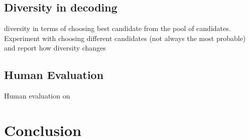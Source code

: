 \documentclass[11pt,a4paper]{article}
\newcommand{\R}{\mathbb{R}}
\begin{document}

\subsection{Diversity in decoding}
diversity in terms of choosing best candidate from the pool of candidates. Experiment with choosing different candidates (not always the most probable) and report how diversity changes

\subsection{Human Evaluation}
Human evaluation on 







\section{Conclusion}
\end{document}
